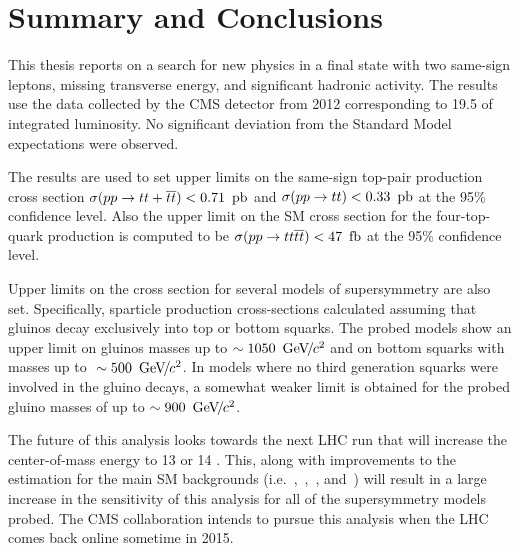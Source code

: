 \chapter{Summary and Conclusions}
\label {ch:conclusion}
This thesis reports on a search for new physics in a final state with two
same-sign leptons, missing transverse energy, and significant hadronic
activity. The results use the data collected by the CMS detector from 2012
corresponding to 19.5 \fbinv of integrated luminosity. No significant deviation
from the Standard Model expectations were observed.

The results are used to set upper limits on the same-sign top-pair production
cross section $\sigma(pp \to tt + {\overline{t}}{\overline{t}}) < 0.71~\mbox{\ensuremath{\,\text{pb}}}$ and
$\sigma(pp \to tt) < 0.33~\mbox{\ensuremath{\,\text{pb}}}$ at the 95\% confidence level. Also the upper
limit on the SM cross section for the four-top-quark production is computed to
be $\sigma(pp \to tt\overline{t}\overline{t}) < 47~\mbox{\ensuremath{\,\text{fb}}}$ at the 95\% confidence level.

Upper limits on the cross section for several models of supersymmetry are also
set. Specifically, sparticle production cross-sections calculated assuming that
gluinos decay exclusively into top or bottom squarks. The probed models show an
upper limit on gluinos masses up to $\sim 1050~{\,\text{Ge\hspace{-.08em}V\hspace{-0.16em}/\hspace{-0.08em}}c^\text{2}}$ and on bottom squarks
with masses up to $~\sim 500~{\,\text{Ge\hspace{-.08em}V\hspace{-0.16em}/\hspace{-0.08em}}c^\text{2}}$. In models where no third generation
squarks were involved in the gluino decays, a somewhat weaker limit is obtained
for the probed gluino masses of up to $\sim 900~{\,\text{Ge\hspace{-.08em}V\hspace{-0.16em}/\hspace{-0.08em}}c^\text{2}}$.

The future of this analysis looks towards the next LHC run that will increase
the center-of-mass energy to 13 or 14 \TeV. This, along with improvements
to the estimation for the main SM backgrounds (i.e.~\ttW,~\ttZ,~\qqWW,
and~\HToTauTau) will result in a large increase in the sensitivity of this
analysis for all of the supersymmetry models probed. The CMS collaboration
intends to pursue this analysis when the LHC comes back online sometime in
2015.
